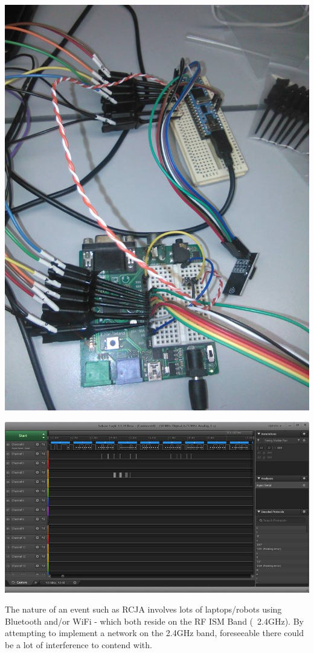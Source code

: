 				\centerline{\includegraphics[width=\linewidth]{images/probing_nrf}}				
				\centerline{\includegraphics[width=\linewidth]{images/logic_analyser}}
				
				The nature of an event such as RCJA involves lots of laptops/robots using Bluetooth and/or WiFi - which both reside on the RF ISM Band (~2.4GHz). By attempting to implement a network on the 2.4GHz band, foreseeable there could be a lot of interference to contend with.\\
				
